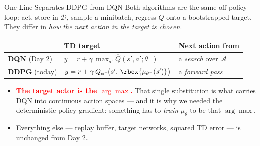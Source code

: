 \begin{frame}{One Line Separates DDPG from DQN}
\vspace{0.6em}
Both algorithms are the same off-policy loop: act, store in $\mathcal{D}$, sample a minibatch, regress $Q$ onto a bootstrapped target. They differ in \emph{how the next action in the target is chosen}.
\vspace{0.8em}
\begin{center}
\renewcommand{\arraystretch}{2.1}
\begin{tabular}{p{} p{} p{}}
\hline
 & \textbf{TD target} & \textbf{Next action from} \\
\hline
\textbf{DQN} (Day 2) & $y = r + \gamma\, \displaystyle\max_{a'} \hat{Q}(s',a';\theta^{-})$ & a \emph{search} over $\mathcal{A}$ \\
\textbf{DDPG} (today) & $y = r + \gamma\, Q_{\phi^{-}}\!\big(s',\, \rbox{\mu_{\theta^{-}}(s')}\big)$ & a \emph{forward pass} \\
\hline
\end{tabular}
\end{center}
\vspace{0.8em}
\begin{itemize}
    \item \textcolor{red}{\textbf{The target actor is the $\arg\max$.}} That single substitution is what carries DQN into continuous action spaces --- and it is why we needed the deterministic policy gradient: something has to \emph{train} $\mu_\theta$ to be that $\arg\max$.
    \item Everything else --- replay buffer, target networks, squared TD error --- is unchanged from Day 2.
\end{itemize}
\end{frame}

